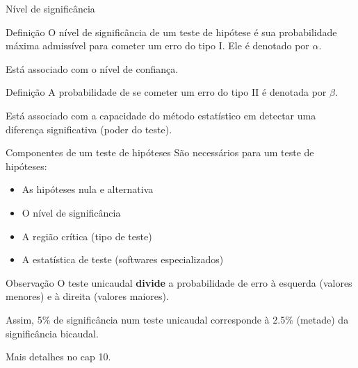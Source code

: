 \documentclass{beamer}
\begin{document}
\begin{frame}{\scriptsize Nível de significância}
  \begin{block}{Definição}
    \footnotesize
    O \alert{nível de significância} de um teste de hipótese é sua
    probabilidade máxima admissível para cometer um erro do tipo
    I. Ele é denotado por $\alpha$.

    \bigskip
    Está associado com o nível de confiança.
  \end{block}
  \begin{block}{Definição}
    \footnotesize
    A probabilidade de se cometer um erro do tipo II é denotada por
    $\beta$.

    \bigskip Está associado com a capacidade do método estatístico em detectar uma diferença significativa (poder do teste).
  \end{block}
\end{frame}

\begin{frame}{\scriptsize Componentes de um teste de hipóteses}
  São necessários para um teste de hipóteses:
  \begin{itemize}
  \item As hipóteses nula e alternativa
  \item O nível de significância
  \item A região crítica (tipo de teste)
  \item A estatística de teste (softwares especializados)
  \end{itemize}
  \begin{block}{Observação}
    \footnotesize
    O teste unicaudal {\bf divide} a probabilidade de erro à esquerda (valores menores) e à direita (valores maiores).

    \bigskip
    Assim, 5\% de significância num teste unicaudal corresponde à 2.5\% (metade) da significância bicaudal.

    \bigskip
    Mais detalhes no cap 10.
  \end{block}
\end{frame}
\end{document}
